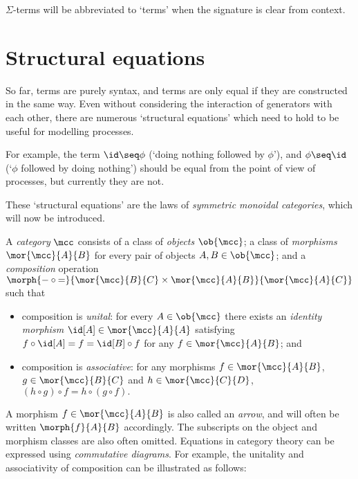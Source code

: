 \(\Sigma\)-terms will be abbreviated to `terms' when the signature is clear from
context.

\section{Structural equations}

So far, terms are purely syntax, and terms are only equal if they are
constructed in the same way.
Even without considering the interaction of generators with each other, there
are numerous `structural equations' which need to hold to be useful for
modelling processes.

For example, the term \(\id \seq \phi\) (`doing nothing followed by \(\phi\)'),
and \(\phi \seq \id\) (`\(\phi\) followed by doing nothing') should be equal
from the point of view of processes, but currently they are not.

These `structural equations' are the laws of
\emph{symmetric monoidal categories}, which will now be introduced.

\begin{definition}[Categories]
    \label{def:category}
    A \emph{category} \(\mcc\) consists of a class of \emph{objects}
    \(\ob{\mcc}\); a class of \emph{morphisms} \(\mor{\mcc}{A}{B}\)
    for every pair of objects \(A, B \in \ob{\mcc}\); and a \emph{composition}
    operation \(
        \morph{
            {-} \circ {=}
        }{
            \mor{\mcc}{B}{C} \times \mor{\mcc}{A}{B}
        }{
            \mor{\mcc}{A}{C}
        }
    \) such that
    \begin{itemize}
        \item composition is \emph{unital}: for every \(
                    A \in \ob{\mcc}
                \) there exists an \emph{identity morphism} \(
                    \id[A] \in \mor{\mcc}{A}{A}
                \) satisfying \(
                    f \circ \id[A] = f = \id[B] \circ f
                \) for any \(
                    f \in \mor{\mcc}{A}{B}
                \); and
        \item composition is \emph{associative}: for any morphisms \(
                    f \in \mor{\mcc}{A}{B}
                \), \(
                    g \in \mor{\mcc}{B}{C}
                \) and \(h \in \mor{\mcc}{C}{D}\), \(
                    (h \circ g) \circ f = h \circ (g \circ f).
                \)
    \end{itemize}
\end{definition}

A morphism \(f \in \mor{\mcc}{A}{B}\) is also called an \emph{arrow}, and will
often be written \(\morph{f}{A}{B}\) accordingly.
The subscripts on the object and morphism classes are also often omitted.
Equations in category theory can be expressed using \emph{commutative diagrams}.
For example, the unitality and associativity of composition can be illustrated
as follows:

